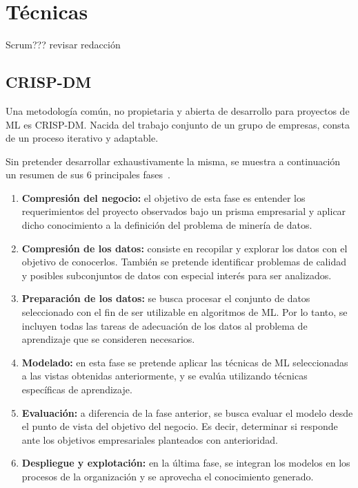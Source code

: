 
\section{Técnicas}

Scrum???
revisar redacción

\subsection{CRISP-DM}
Una metodología común, no propietaria y abierta de desarrollo para proyectos de ML es CRISP-DM. Nacida del trabajo conjunto de un grupo de empresas, consta de un proceso iterativo y adaptable.

Sin pretender desarrollar exhaustivamente la misma, se muestra a continuación un resumen de sus 6 principales fases~\cite{apuntesSisint}.

\begin{enumerate}
	\item \textbf{Compresión del negocio:} el objetivo de esta fase es entender los requerimientos del proyecto observados bajo un prisma empresarial y aplicar dicho conocimiento a la definición del problema de minería de datos.
	
	\item \textbf{Compresión de los datos:} consiste en recopilar y explorar los datos con el objetivo de conocerlos. También se pretende identificar problemas de calidad y posibles subconjuntos de datos con especial interés para ser analizados.
	
	\item \textbf{Preparación de los datos:} se busca procesar el conjunto de datos seleccionado con el fin de ser utilizable en algoritmos de ML. Por lo tanto, se incluyen todas las tareas de adecuación de los datos al problema de aprendizaje que se consideren necesarios.
	
	\item \textbf{Modelado:} en esta fase se pretende aplicar las técnicas de ML seleccionadas a las vistas obtenidas anteriormente, y se evalúa utilizando técnicas específicas de aprendizaje. 
	
	\item \textbf{Evaluación:} a diferencia de la fase anterior, se busca evaluar el modelo desde el punto de vista del objetivo del negocio. Es decir, determinar si responde ante los objetivos empresariales planteados con anterioridad.
	
	\item \textbf{Despliegue y explotación:} en la última fase, se integran los modelos en los procesos de la organización y se aprovecha el conocimiento generado.
\end{enumerate}

